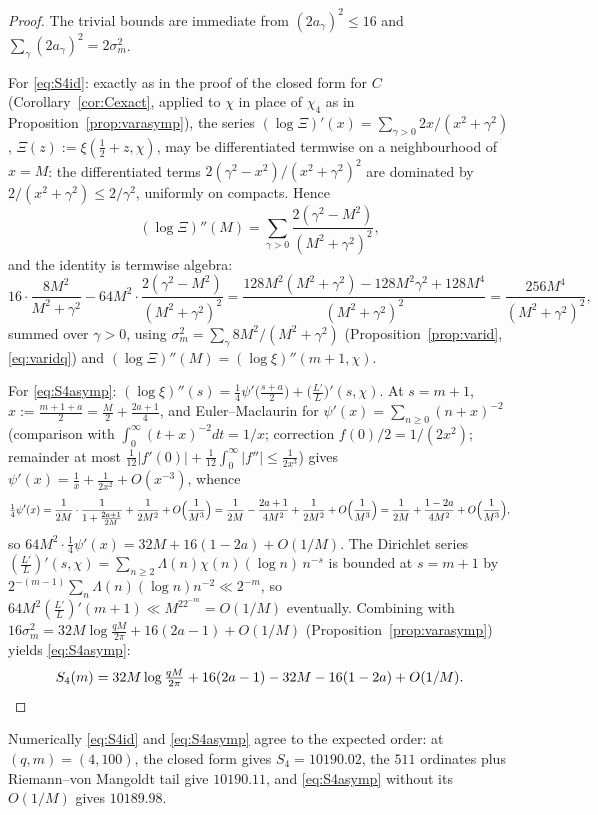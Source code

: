 \begin{proof}
The trivial bounds are immediate from $(2a_\gamma)^2\le16$ and
$\sum_\gamma(2a_\gamma)^2=2\sigma_m^2$.

For \eqref{eq:S4id}: exactly as in the proof of the closed form for
$C$ (Corollary~\ref{cor:Cexact}, applied to $\chi$ in place of
$\chi_4$ as in Proposition~\ref{prop:varasymp}), the series
$(\log\Xi)'(x)=\sum_{\gamma>0}2x/(x^2+\gamma^2)$,
$\Xi(z):=\xi(\tfrac12+z,\chi)$, may be differentiated termwise on a
neighbourhood of $x=M$: the differentiated terms
$2(\gamma^2-x^2)/(x^2+\gamma^2)^2$ are dominated by
$2/(x^2+\gamma^2)\le2/\gamma^2$, uniformly on compacts. Hence
\[
(\log\Xi)''(M)=\sum_{\gamma>0}\frac{2(\gamma^2-M^2)}{(M^2+\gamma^2)^2},
\]
and the identity is termwise algebra:
\[
16\cdot\frac{8M^2}{M^2+\gamma^2}
-64M^2\cdot\frac{2(\gamma^2-M^2)}{(M^2+\gamma^2)^2}
=\frac{128M^2(M^2+\gamma^2)-128M^2\gamma^2+128M^4}{(M^2+\gamma^2)^2}
=\frac{256M^4}{(M^2+\gamma^2)^2},
\]
summed over $\gamma>0$, using
$\sigma_m^2=\sum_\gamma8M^2/(M^2+\gamma^2)$
(Proposition~\ref{prop:varid}, \eqref{eq:varidq}) and
$(\log\Xi)''(M)=(\log\xi)''(m+1,\chi)$.

For \eqref{eq:S4asymp}: $(\log\xi)''(s)=\tfrac14\psi'\bigl(\tfrac{s+a}2
\bigr)+\bigl(\tfrac{L'}{L}\bigr)'(s,\chi)$. At $s=m+1$,
$x:=\tfrac{m+1+a}2=\tfrac M2+\tfrac{2a+1}4$, and Euler--Maclaurin for
$\psi'(x)=\sum_{n\ge0}(n+x)^{-2}$ (comparison with
$\int_0^\infty(t+x)^{-2}dt=1/x$; correction $f(0)/2=1/(2x^2)$;
remainder at most
$\tfrac1{12}|f'(0)|+\tfrac1{12}\int_0^\infty|f''|\le\tfrac1{2x^3}$)
gives $\psi'(x)=\tfrac1x+\tfrac1{2x^2}+O(x^{-3})$, whence
\[
\tfrac14\psi'(x)=\frac1{2M}\cdot\frac1{1+\frac{2a+1}{2M}}
+\frac1{2M^2}+O\Bigl(\frac1{M^3}\Bigr)
=\frac1{2M}-\frac{2a+1}{4M^2}+\frac1{2M^2}
+O\Bigl(\frac1{M^3}\Bigr)
=\frac1{2M}+\frac{1-2a}{4M^2}+O\Bigl(\frac1{M^3}\Bigr),
\]
so $64M^2\cdot\tfrac14\psi'(x)=32M+16(1-2a)+O(1/M)$. The Dirichlet
series $(\tfrac{L'}{L})'(s,\chi)=\sum_{n\ge2}\Lambda(n)\chi(n)(\log
n)\,n^{-s}$ is bounded at $s=m+1$ by
$2^{-(m-1)}\sum_n\Lambda(n)(\log n)n^{-2}\ll2^{-m}$, so
$64M^2(\tfrac{L'}{L})'(m+1)\ll M^22^{-m}=O(1/M)$ eventually. Combining
with $16\sigma_m^2=32M\log\tfrac{qM}{2\pi}+16(2a-1)+O(1/M)$
(Proposition~\ref{prop:varasymp}) yields \eqref{eq:S4asymp}:
\[
S_4(m)=32M\log\tfrac{qM}{2\pi}+16(2a-1)-32M-16(1-2a)+O(1/M).
\qedhere
\]
\end{proof}

Numerically \eqref{eq:S4id} and \eqref{eq:S4asymp} agree to the
expected order: at $(q,m)=(4,100)$, the closed form gives
$S_4=10190.02$, the $511$ ordinates plus Riemann--von Mangoldt tail
give $10190.11$, and \eqref{eq:S4asymp} without its $O(1/M)$ gives
$10189.98$.

